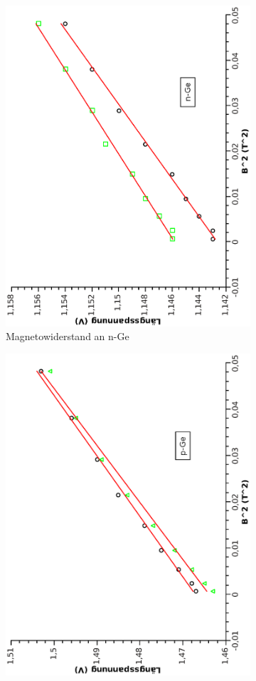 \documentclass[12pt,a4paper,twopage]{article}
\begin{document}
\begin{figure}
\begin{subfigure}{0.4\textwidth}
\includegraphics[width=0.9\linewidth, angle=-90]{magneton.eps}
\caption{Magnetowiderstand an n-Ge}
\end{subfigure}
\begin{subfigure}{0.4\textwidth}
\includegraphics[width=0.9\linewidth, angle=-90]{magnetop.eps}

\end{subfigure}
\end{figure}
\end{document}
